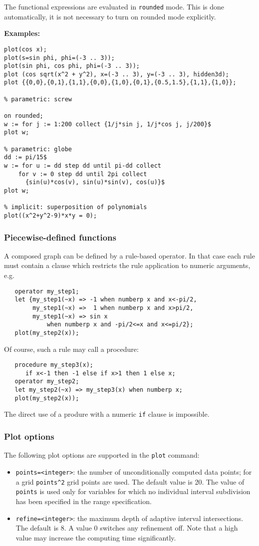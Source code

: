 The functional expressions are evaluated in \texttt{rounded} mode.  This is done
automatically, it is not necessary to turn on rounded mode explicitly.

\textbf{Examples:}
\begin{verbatim}
plot(cos x);
plot(s=sin phi, phi=(-3 .. 3));
plot(sin phi, cos phi, phi=(-3 .. 3));
plot (cos sqrt(x^2 + y^2), x=(-3 .. 3), y=(-3 .. 3), hidden3d);
plot {{0,0},{0,1},{1,1},{0,0},{1,0},{0,1},{0.5,1.5},{1,1},{1,0}};

% parametric: screw

on rounded;
w := for j := 1:200 collect {1/j*sin j, 1/j*cos j, j/200}$
plot w;

% parametric: globe
dd := pi/15$
w := for u := dd step dd until pi-dd collect
    for v := 0 step dd until 2pi collect
      {sin(u)*cos(v), sin(u)*sin(v), cos(u)}$
plot w;

% implicit: superposition of polynomials
plot((x^2+y^2-9)*x*y = 0);
\end{verbatim}
 

\subsubsection{Piecewise-defined functions}
A composed graph can be defined by a rule-based operator.  In that case each
rule must contain a clause which restricts the rule application to numeric
arguments, e.g.
\begin{verbatim}
   operator my_step1;
   let {my_step1(~x) => -1 when numberp x and x<-pi/2, 
        my_step1(~x) =>  1 when numberp x and x>pi/2,
        my_step1(~x) => sin x
            when numberp x and -pi/2<=x and x<=pi/2};
   plot(my_step2(x));
\end{verbatim}
Of course, such a rule may call a procedure:
\begin{verbatim}
   procedure my_step3(x);
      if x<-1 then -1 else if x>1 then 1 else x;
   operator my_step2;
   let my_step2(~x) => my_step3(x) when numberp x; 
   plot(my_step2(x));
\end{verbatim}
The direct use of a produre with a numeric \texttt{if} clause is impossible. 

\subsubsection{Plot options}
The following plot options are supported in the \texttt{plot} command:
\begin{itemize}
   \item \texttt{points=<integer>}: the number of unconditionally computed data
     points; for a grid \texttt{points\^{}2} grid points are used.  The default
     value is 20. The value of \texttt{points} is used only for variables for
     which no individual interval subdivision has been specified in the range
     specification.
   \item \texttt{refine=<integer>}: the maximum depth of adaptive interval
     intersections. The default is 8. A value 0 switches any refinement
     off. Note that a high value may increase the computing time significantly.
\end{itemize}


